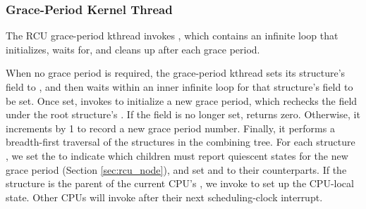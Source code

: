 \subsubsection{Grace-Period Kernel Thread} \label{sec:rcu_gp_kthread}
The RCU grace-period kthread invokes , which
contains an infinite loop that initializes, waits for, and cleans up after
each grace period.

When no grace period is required, the grace-period kthread
sets its  structure's  field to
, and then
waits within an inner infinite loop for that structure's
 field to be set.
Once set,  invokes  to initialize
a new grace period, which
rechecks the  field under
the root  structure's .
If the field is no longer set,  returns zero.
Otherwise, it
increments  by 1 to record a new grace period number.
%
Finally, it performs a breadth-first traversal of the 
structures in the combining tree.
For each  structure ,
%
we set the  to indicate which children
must report quiescent states for the new grace period (Section
\ref{sec:rcu_node}), and set  and 
to their  counterparts.
%
If the  structure  is the parent of the current CPU's ,
we invoke  to set up the CPU-local  state.
Other CPUs will invoke  after their next
scheduling-clock interrupt. %



